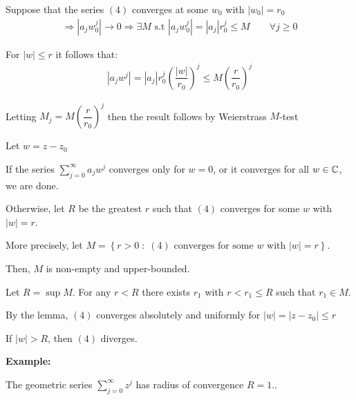 \begin{prf}[]{}
  Suppose that the series $(4)$ converges at some $w_0$ with $\left|w_0\right| = r_0$
  \begin{equation*}
    \begin{gathered}
      \Rightarrow \left|a_jw_0^j\right|\to0\Rightarrow\exists M\text{ s.t } \left|a_jw_0^j\right| = \left|a_j\right|r_0^j\leq M\qquad\forall j\geq0
    \end{gathered}
  \end{equation*}
  \par\bigskip
  \noindent For $\left|w\right|\leq r$ it follows that:
  \begin{equation*}
    \begin{gathered}
      \left|a_jw^j\right| = \left|a_j\right|r_0^j\left(\dfrac{\left|w\right|}{r_0}\right)^j\leq M\left(\dfrac{r}{r_0}\right)^j
    \end{gathered}
  \end{equation*}
  \par\bigskip
  \noindent Letting $M_j = M\left(\dfrac{r}{r_0}\right)^j$ then the result follows by Weierstrass $M$-test
\end{prf}
\newpage
\begin{prf}[av Sats 17.2]{}
  Let $w = z-z_0$\par
  \noindent If the series $\sum_{j=0}^{\infty}a_jw^j$ converges only for $w = 0$, or it converges for all $w\in\mathbb{C}$, we are done.
  \par\bigskip
  \noindent Otherwise, let $R$ be the greatest $r$ such that $(4)$ converges for some $w$ with $\left|w\right| = r$.\par
  \noindent More precisely, let $M = \left\{r>0\;:\;(4)\text{ converges for some $w$ with $\left|w\right| = r$}\right\}$.\par
  \noindent Then, $M$ is non-empty and upper-bounded.
  \par\bigskip
  \noindent Let $R = \sup M$. For any $r<R$ there exists $r_1$ with $r<r_1\leq R$ such that $r_1\in M$.
  \par\bigskip
  \noindent By the lemma, $(4)$ converges absolutely and uniformly for $\left|w\right| = \left|z-z_0\right|\leq r$\par
  \noindent If $\left|w\right|>R$, then $(4)$ diverges.
\end{prf}
\par\bigskip
\noindent\textbf{Example:}\par
\noindent The geometric series $\sum_{j=0}^{\infty}z^j$ has radius of convergence $R = 1$..\par
